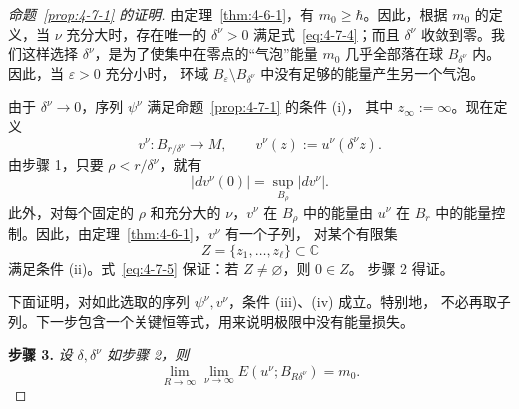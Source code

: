 \begin{proof}[命题~\ref{prop:4-7-1} 的证明]
由定理~\ref{thm:4-6-1}，有 $m_0\ge\hbar$。因此，根据 $m_0$ 的定义，当 $\nu$
充分大时，存在唯一的 $\delta^\nu>0$ 满足式~\eqref{eq:4-7-4}；而且
$\delta^\nu$ 收敛到零。我们这样选择 $\delta^\nu$，是为了使集中在零点的“气泡”能量
$m_0$ 几乎全部落在球 $B_{\delta^\nu}$ 内。因此，当 $\varepsilon>0$ 充分小时，
环域 $B_\varepsilon\setminus B_{\delta^\nu}$ 中没有足够的能量产生另一个气泡。

由于 $\delta^\nu\to0$，序列 $\psi^\nu$ 满足命题~\ref{prop:4-7-1} 的条件 (i)，
其中 $z_\infty:=\infty$。现在定义
\[
  v^\nu:B_{r/\delta^\nu}\to M,
  \qquad
  v^\nu(z):=u^\nu(\delta^\nu z).
\]
由步骤 1，只要 $\rho<r/\delta^\nu$，就有
\begin{equation}\label{eq:4-7-5}
  |dv^\nu(0)|=\sup_{B_\rho}|dv^\nu|.
\end{equation}
此外，对每个固定的 $\rho$ 和充分大的 $\nu$，$v^\nu$ 在 $B_\rho$ 中的能量由
$u^\nu$ 在 $B_r$ 中的能量控制。因此，由定理~\ref{thm:4-6-1}，$v^\nu$ 有一个子列，
对某个有限集
\[
  Z=\{z_1,\ldots,z_\ell\}\subset\mathbb C
\]
满足条件 (ii)。式~\eqref{eq:4-7-5} 保证：若 $Z\ne\varnothing$，则 $0\in Z$。
步骤 2 得证。

下面证明，对如此选取的序列 $\psi^\nu,v^\nu$，条件 (iii)、(iv) 成立。特别地，
不必再取子列。下一步包含一个关键恒等式，用来说明极限中没有能量损失。

\medskip
\noindent\textbf{步骤 3.}\quad
\emph{设 $\delta,\delta^\nu$ 如步骤 2，则}
\begin{equation}\label{eq:4-7-6}
  \lim_{R\to\infty}\lim_{\nu\to\infty}
  E(u^\nu;B_{R\delta^\nu})=m_0.
\end{equation}


\end{proof}
